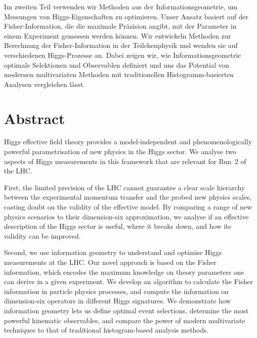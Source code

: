 Im zweiten Teil verwenden wir Methoden aus der Informationsgeometrie,
um Messungen von Higgs-Eigenschaften zu optimieren. Unser Ansatz
basiert auf der Fisher-Information, die die maximale Pr\"azision
angibt, mit der Parameter in einem Experiment gemessen werden
k\"onnen. Wir entwickeln Methoden zur Berechnung der
Fisher-Information in der Teilchenphysik und wenden sie auf
verschiedenen Higgs-Prozesse an. Dabei zeigen wir, wie
Informationsgeometrie optimale Selektionen und Observablen definiert
und uns das Potential von modernen multivariaten Methoden mit
traditionellen Histogramm-basierten Analysen vergleichen l\"asst.




\chapter*{Abstract}


Higgs effective field theory provides a model-independent and
phenomenologically powerful parametrisation of new physics in the
Higgs sector. We analyse two aspects of Higgs measurements in this
framework that are relevant for Run~2 of the LHC.

First, the limited precision of the LHC cannot guarantee a clear scale
hierarchy between the experimental momentum transfer and the probed
new physics scales, casting doubt on the validity of the effective
model. By comparing a range of new physics scenarios to their
dimension-six approximation, we analyse if an effective description
of the Higgs sector is useful, where it breaks down, and how its
validity can be improved.

Second, we use information geometry to understand and optimise Higgs
measurements at the LHC. Our novel approach is based on the Fisher
information, which encodes the maximum knowledge on theory parameters
one can derive in a given experiment. We develop an algorithm to
calculate the Fisher information in particle physics processes, and
compute the information on dimension-six operators in different Higgs
signatures.  We demonstrate how information geometry lets us define
optimal event selections, determine the most powerful kinematic
observables, and compare the power of modern multivariate techniques
to that of traditional histogram-based analysis methods.
